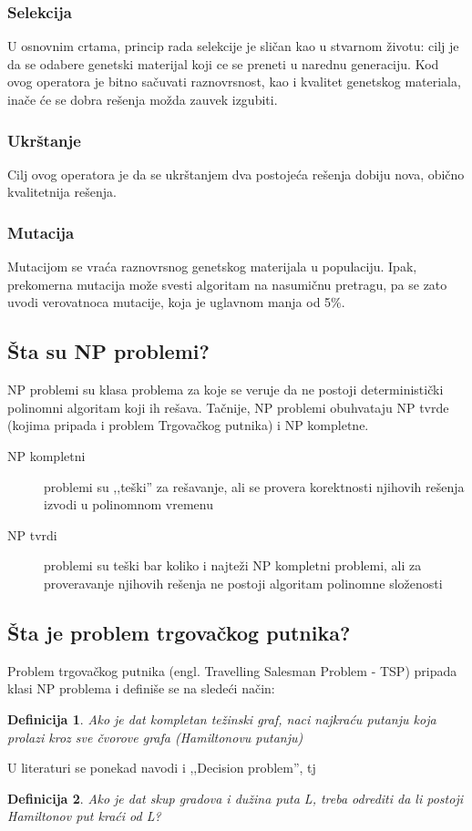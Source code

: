 \documentclass[titlepage]{article}
\newtheorem{df}{Definicija}
\begin{document}
            \subsubsection{Selekcija}
            U osnovnim crtama, princip rada selekcije je sli\v{c}an kao u stvarnom \v{z}ivotu: cilj je da se odabere genetski materijal koji ce se preneti u narednu generaciju. Kod ovog operatora je bitno sa\v{c}uvati raznovrsnost, kao i kvalitet genetskog materiala, ina\v{c}e \'{c}e se dobra re\v{s}enja mo\v{z}da zauvek izgubiti.
            \subsubsection{Ukr\v{s}tanje}
            Cilj ovog operatora je da se ukr\v{s}tanjem dva postoje\'{c}a re\v{s}enja dobiju nova, obi\v{c}no kvalitetnija re\v{s}enja.
            \subsubsection{Mutacija}
            Mutacijom se vra\'{c}a raznovrsnog genetskog materijala u populaciju. Ipak, prekomerna mutacija mo\v{z}e svesti algoritam na nasumi\v{c}nu pretragu, pa se zato uvodi verovatnoca mutacije, koja je uglavnom manja od 5\%.
    	\subsection{\v{S}ta su NP problemi?}
    	NP problemi su klasa problema za koje se veruje da ne postoji deterministi\v{c}ki polinomni algoritam koji ih re\v{s}ava. Ta\v{c}nije, NP problemi obuhvataju NP tvrde (kojima pripada i problem Trgova\v{c}kog putnika) i NP kompletne.
        \begin{description}
          \item[NP kompletni] problemi su ,,te\v{s}ki'' za re\v{s}avanje, ali se provera korektnosti njihovih re\v{s}enja izvodi u polinomnom vremenu
          \item[NP tvrdi] problemi su te\v{s}ki bar koliko i najte\v{z}i NP kompletni problemi, ali za proveravanje njihovih re\v{s}enja ne postoji algoritam polinomne slo\v{z}enosti
        \end{description}
        \subsection{\v{S}ta je problem trgova\v{c}kog putnika?}
        Problem trgova\v{c}kog putnika (engl. Travelling Salesman Problem - TSP) pripada klasi NP problema i defini\v{s}e se na slede\'{c}i na\v{c}in:
         \begin{df}
        Ako je dat kompletan te\v{z}inski graf, naci najkra\'{c}u putanju koja prolazi kroz sve \v{c}vorove grafa (Hamiltonovu putanju)
        \end{df}
        U literaturi se ponekad navodi i ,,Decision problem'', tj
        \begin{df}
        Ako je dat skup gradova i du\v{z}ina puta L, treba odrediti da li postoji Hamiltonov put kra\'{c}i od L?
        \end{df}
\end{document}
